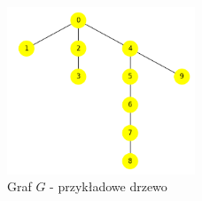\begin{figure}[H]
    \centering
    \includegraphics[width=0.5\textwidth]{assets/image.png}
    \caption{Graf $G$ - przykładowe drzewo}
    \label{fig:drzewo}
\end{figure}

